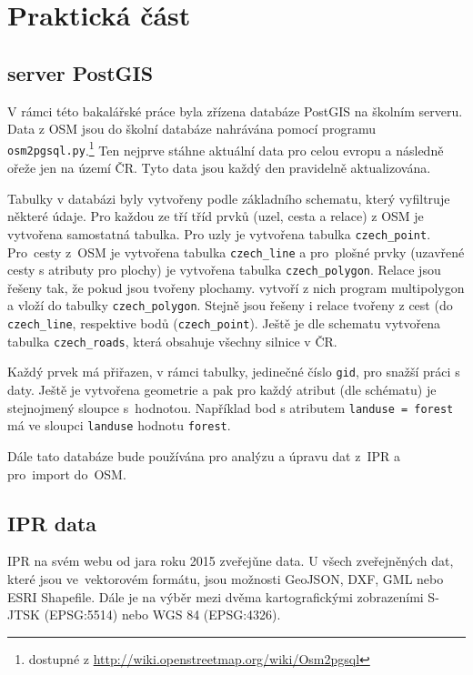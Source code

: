 \chapter{Praktická část}
\label{3-Praktická část}

\section{server PostGIS}
\label{server PostGIS}
V rámci této bakalářské práce byla zřízena databáze PostGIS na školním
serveru. Data z OSM jsou do školní databáze nahrávána pomocí programu {\tt osm2pgsql.py}.\footnote{dostupné z \url{http://wiki.openstreetmap.org/wiki/Osm2pgsql}}
Ten nejprve stáhne aktuální data pro celou evropu a následně ořeže
jen na území ČR. Tyto data jsou každý den pravidelně aktualizována.

Tabulky v databázi byly vytvořeny podle základního schematu, který vyfiltruje některé údaje.
Pro každou ze tří tříd prvků (uzel, cesta a relace) z OSM je vytvořena samostatná 
tabulka. Pro uzly je vytvořena tabulka {\tt czech\_point}.
Pro~cesty z~OSM je vytvořena tabulka {\tt czech\_line} a pro~plošné 
prvky (uzavřené cesty s atributy pro plochy) je vytvořena tabulka
{\tt czech\_polygon}. Relace jsou řešeny tak, že pokud jsou tvořeny plochamy.
vytvoří z nich program multipolygon a vloží do tabulky {\tt czech\_polygon}.
Stejně jsou řešeny i relace tvořeny z cest (do {\tt czech\_line}, respektive bodů ({\tt czech\_point}).
Ještě je dle schematu vytvořena tabulka {\tt czech\_roads}, která obsahuje všechny silnice v ČR.

Každý prvek má přiřazen, v rámci tabulky, jedinečné číslo {\tt gid}, pro snažší práci s daty. Ještě je vytvořena geometrie a pak pro každý atribut (dle schématu) 
je stejnojmený sloupce s~hodnotou. 
Například bod s atributem {\tt landuse = forest} má ve sloupci 
{\tt landuse} hodnotu {\tt forest}.

Dále tato databáze bude používána pro analýzu a úpravu dat z~IPR a
pro~import do~OSM.

\section{IPR data}
\label{IPR data}
IPR na svém webu od jara roku 2015 zveřejǔne data.
U všech zveřejněných dat, které jsou ve~vektorovém formátu,
jsou možnosti GeoJSON, DXF, GML nebo ESRI Shapefile.
Dále je na výběr mezi dvěma kartografickými zobrazeními S-JTSK (EPSG:5514) nebo WGS 84 (EPSG:4326).

